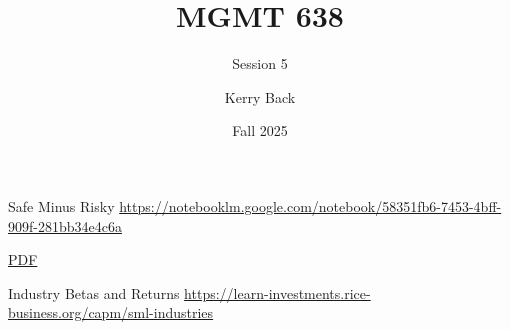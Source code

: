 \documentclass[aspectratio=169]{beamer}
\title{MGMT 638}
\subtitle{Session 5}
\author{Kerry Back}
\institute{}
\date{Fall 2025}
\begin{document}
\maketitle

\begin{frame}{Safe Minus Risky}
\centering
\Large
\url{https://notebooklm.google.com/notebook/58351fb6-7453-4bff-909f-281bb34e4c6a}

\vspace{1em}

\href{https://mgmt638.kerryback.com/Kapadia_Ostdiek_Weston_Zekhnini_JFQA_2019.pdf}{PDF}
\end{frame}

\begin{frame}{Industry Betas and Returns}
\centering
\Large
\url{https://learn-investments.rice-business.org/capm/sml-industries}
\end{frame}
\end{document}

